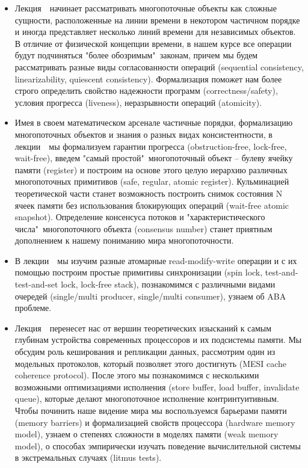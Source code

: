 \documentclass[a4paper, 12pt]{extarticle}
\begin{document}
\begin{itemize}

\item Лекция~\foundationsNum~начинает рассматривать многопоточные объекты как сложные сущности, расположенные на линии времени в некотором частичном порядке и иногда представляет несколько линий времени для независимых объектов. В отличие от физической концепции времени, в нашем курсе все операции будут подчиняться "более обозримым"\ законам, причем мы будем рассматривать разные виды согласованности операций (sequential consistency, linearizability, quiescent consistency). Формализация поможет нам более строго определить свойство надежности программ (correctness/safety), условия прогресса (liveness), неразрывности операций (atomicity).

\item Имея в своем математическом арсенале частичные порядки, формализацию многопоточных объектов и знания о разных видах консистентности, в лекции~\foundationsPlusNum~мы формализуем гарантии прогресса (obstruction-free, lock-free, wait-free), введем "самый простой"\ многопоточный объект -- булеву ячейку памяти (register) и построим на основе этого целую иерархию различных многопоточных примитивов (safe, regular, atomic register). Кульминацией теоретической части станет возможность построить снимок состояния N ячеек памяти без использования блокирующих операций (wait-free atomic snapshot). Определение консенсуса потоков и "характеристического числа"\ многопоточного объекта (consensus number) станет приятным дополнением к нашему пониманию мира многопоточности.

\item В лекции~\atomicsNum~мы изучим разные атомарные read-modify-write операции и с их помощью построим простые примитивы синхронизации (spin lock, test-and-test-and-set lock, lock-free stack), познакомимся с различными видами очередей (single/multi producer, single/multi consumer), узнаем об ABA проблеме.

\item Лекция~\cacheCoherencyNum~перенесет нас от вершин теоретических изысканий к самым глубинам устройства современных процессоров и их подсистемы памяти. Мы обсудим роль кеширования и репликации данных, рассмотрим один из модельных протоколов, который позволяет этого достигнуть (MESI cache coherence protocol). После этого мы познакомимся с несколькими возможными оптимизациями исполнения (store buffer, load buffer, invalidate queue), которые делают многопоточное исполнение контринтуитивным. Чтобы починить наше видение мира мы воспользуемся барьерами памяти (memory barriers) и формализацией свойств процессора (hardware memory model), узнаем о степенях сложности в моделях памяти (weak memory model), о способах эмпирически изучать поведение вычислительной системы в экстремальных случаях (litmus tests).


\end{itemize}
\end{document}
